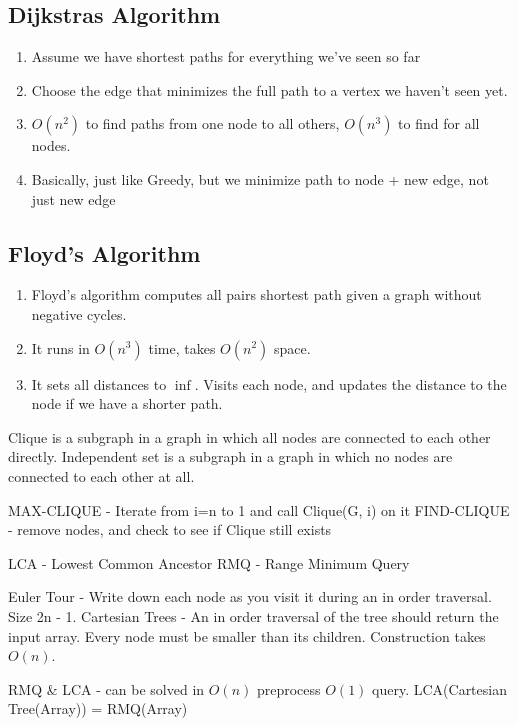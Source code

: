\documentclass[12pt,twocolumn]{article}
\begin{document}
\subsection{Dijkstras Algorithm}
\begin{enumerate}
    \item Assume we have shortest paths for everything we've seen so far
    \item Choose the edge that minimizes the full path to a vertex we haven't seen yet.
    \item $O(n^2)$ to find paths from one node to all others, $O(n^3)$ to find for all nodes.
    \item Basically, just like Greedy, but we minimize path to node + new edge, not just new edge
\end{enumerate}

\subsection{Floyd's Algorithm}
\begin{enumerate}
    \item Floyd's algorithm computes all pairs shortest path given a graph without negative cycles.
    \item It runs in $O(n^3)$ time, takes $O(n^2)$ space.
    \item It sets all distances to $\inf$. Visits each node, and updates the distance to the node if we have a shorter path.
\end{enumerate}

Clique is a subgraph in a graph in which all nodes are connected to each other directly.
Independent set is a subgraph in a graph in which no nodes are connected to each other at all.

MAX-CLIQUE - Iterate from i=n to 1 and call Clique(G, i) on it
FIND-CLIQUE - remove nodes, and check to see if Clique still exists

LCA - Lowest Common Ancestor
RMQ - Range Minimum Query

Euler Tour - Write down each node as you visit it during an in order traversal. Size 2n - 1.
Cartesian Trees - An in order traversal of the tree should return the input array. Every node must be smaller than its children. Construction takes $O(n)$.

RMQ \& LCA - can be solved in $O(n)$ preprocess $O(1)$ query. LCA(Cartesian Tree(Array)) = RMQ(Array)
\end{document}
